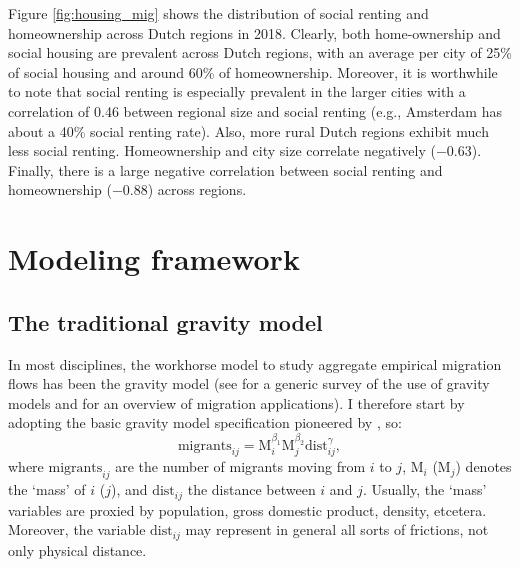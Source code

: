 \documentclass[fleqn,10pt]{SelfArx} %
\begin{document}
Figure \ref{fig:housing_mig} shows the distribution of social renting and
homeownership across Dutch regions in 2018. Clearly, both home-ownership
and social housing are prevalent across Dutch regions, with an average
per city of 25\% of social housing and around 60\% of homeownership. Moreover, it
is worthwhile to note that social renting is especially prevalent in the larger
cities with a correlation of 0.46 between regional size and social renting (e.g.,
Amsterdam has about a 40\% social renting rate). Also, more rural Dutch regions
exhibit much less social renting. Homeownership and city size
correlate negatively ($-0.63$). Finally, there is a large negative correlation
between social renting and homeownership ($-0.88$) across regions.

\section{Modeling framework}

\subsection{The traditional gravity model}

In most disciplines, the workhorse model to study aggregate empirical migration
flows has been the gravity model (see \citet{anderson2011gravity} for a generic
survey of the use of gravity models and \citet{poot2016gravity} for an overview
of migration applications). I therefore start by adopting the basic gravity
model specification pioneered by \citet{tinbergen1962shaping}, so:
\begin{equation}
  \text{migrants}_{ij} = \text{M}_i^{\beta_1}\text{M}_j^{\beta_2}\text{dist}_{ij}^\gamma,
  \label{eq:grav}
\end{equation}
where $\text{migrants}_{ij}$ are the number of migrants moving from $i$ to $j$,
$\text{M}_i$ ($\text{M}_j$) denotes the `mass' of $i$ ($j$), and
$\text{dist}_{ij}$ the distance between $i$ and $j$. Usually, the `mass'
variables are proxied by population, gross domestic product, density, etcetera.
Moreover, the variable $\text{dist}_{ij}$ may represent in general all sorts of
frictions, not only physical distance.
\end{document}
